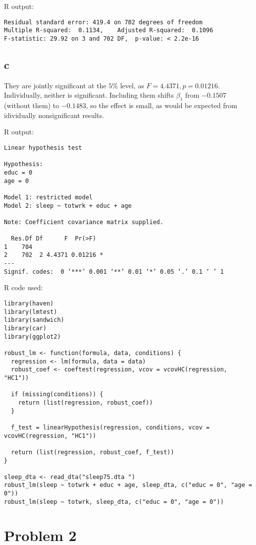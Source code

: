 \documentclass[12pt,letterpaper]{article}
\theoremstyle{definition}
\begin{document}
R output:
\begin{Verbatim}[fontsize=\small]
Residual standard error: 419.4 on 702 degrees of freedom
Multiple R-squared:  0.1134,	Adjusted R-squared:  0.1096
F-statistic: 29.92 on 3 and 702 DF,  p-value: < 2.2e-16
\end{Verbatim}

\subsection*{c}

They are jointly significant at the $5\%$ level, as $F = 4.4371, p = 0.01216$. Individually, neither is significant. Including them shifts $\beta_{1}$ from $-0.1507$ (without them) to $-0.1483$, so the effect is small, as would be expected from idividually nonsignificant results.

R output:
\begin{Verbatim}[fontsize=\small]
Linear hypothesis test

Hypothesis:
educ = 0
age = 0

Model 1: restricted model
Model 2: sleep ~ totwrk + educ + age

Note: Coefficient covariance matrix supplied.

  Res.Df Df      F  Pr(>F)
1    704
2    702  2 4.4371 0.01216 *
---
Signif. codes:  0 ‘***’ 0.001 ‘**’ 0.01 ‘*’ 0.05 ‘.’ 0.1 ‘ ’ 1
\end{Verbatim}

R code used:
\begin{Verbatim}[fontsize=\small]
library(haven)
library(lmtest)
library(sandwich)
library(car)
library(ggplot2)

robust_lm <- function(formula, data, conditions) {
  regression <- lm(formula, data = data)
  robust_coef <- coeftest(regression, vcov = vcovHC(regression, "HC1"))

  if (missing(conditions)) {
    return (list(regression, robust_coef))
  }

  f_test = linearHypothesis(regression, conditions, vcov = vcovHC(regression, "HC1"))

  return (list(regression, robust_coef, f_test))
}

sleep_dta <- read_dta("sleep75.dta ")
robust_lm(sleep ~ totwrk + educ + age, sleep_dta, c("educ = 0", "age = 0"))
robust_lm(sleep ~ totwrk, sleep_dta, c("educ = 0", "age = 0"))
\end{Verbatim}


\section*{Problem 2}
\end{document}
